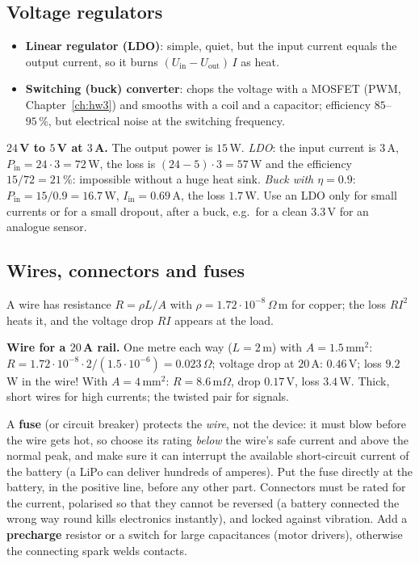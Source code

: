 \subsection*{Voltage regulators}
\begin{itemize}[nosep]
\item \textbf{Linear regulator (LDO)}: simple, quiet, but the input current equals the output current, so it burns $(U_\text{in}-U_\text{out})\,I$ as heat.
\item \textbf{Switching (buck) converter}: chops the voltage with a MOSFET (PWM, Chapter~\ref{ch:hw3}) and smooths with a coil and a capacitor; efficiency $85$--$95\,\%$, but electrical noise at the switching frequency.
\end{itemize}
\begin{example}
\textbf{$24$\,V to $5$\,V at $3$\,A.} The output power is $15$\,W. \emph{LDO}: the input current is $3$\,A, $P_\text{in}=24\cdot3=72$\,W, the loss is $(24-5)\cdot3=57$\,W and the efficiency $15/72=21\,\%$: impossible without a huge heat sink. \emph{Buck with $\eta=0.9$}: $P_\text{in}=15/0.9=16.7$\,W, $I_\text{in}=0.69$\,A, the loss $1.7$\,W. Use an LDO only for small currents or for a small dropout, after a buck, e.g.\ for a clean $3.3$\,V for an analogue sensor.
\end{example}

\subsection*{Wires, connectors and fuses}
A wire has resistance $R=\rho L/A$ with $\rho=1.72\cdot10^{-8}\,\Omega$\,m for copper; the loss $RI^2$ heats it, and the voltage drop $RI$ appears at the load.
\begin{example}
\textbf{Wire for a $20$\,A rail.} One metre each way ($L=2$\,m) with $A=1.5$\,mm$^2$: $R=1.72\cdot10^{-8}\cdot2/(1.5\cdot10^{-6})=0.023\,\Omega$; voltage drop at $20$\,A: $0.46$\,V; loss $9.2$\,W in the wire! With $A=4$\,mm$^2$: $R=8.6$\,m$\Omega$, drop $0.17$\,V, loss $3.4$\,W. Thick, short wires for high currents; the twisted pair for signals.
\end{example}
A \textbf{fuse} (or circuit breaker) protects the \emph{wire}, not the device: it must blow before the wire gets hot, so choose its rating \emph{below} the wire's safe current and above the normal peak, and make sure it can interrupt the available short-circuit current of the battery (a LiPo can deliver hundreds of amperes). Put the fuse directly at the battery, in the positive line, before any other part. Connectors must be rated for the current, polarised so that they cannot be reversed (a battery connected the wrong way round kills electronics instantly), and locked against vibration. Add a \textbf{precharge} resistor or a switch for large capacitances (motor drivers), otherwise the connecting spark welds contacts.

